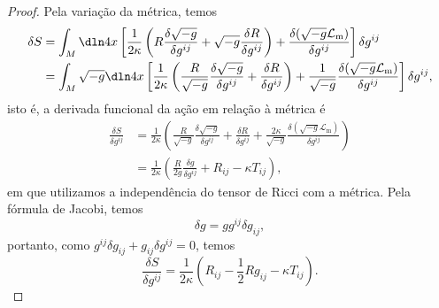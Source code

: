 \documentclass[portuguese]{artigo}
\begin{document}
\begin{proof}
    Pela variação da métrica, temos
    \begin{align*}
        \delta S &= \int_M \dln4x \left[\frac1{2 \kappa}\left(R \frac{\delta\sqrt{-g}}{\delta g^{ij}} + \sqrt{-g} \frac{\delta R}{\delta g^{ij}}\right) + \frac{\delta (\sqrt{-g} \mathcal{L}_\mathrm{m})}{\delta g^{ij}}\right] \delta g^{ij}\\
                 &=\int_M \sqrt{-g}\dln4x \left[\frac1{2 \kappa}\left(\frac{R}{\sqrt{-g}} \frac{\delta\sqrt{-g}}{\delta g^{ij}} +  \frac{\delta R}{\delta g^{ij}}\right) + \frac{1}{\sqrt{-g}}\frac{\delta (\sqrt{-g} \mathcal{L}_\mathrm{m})}{\delta g^{ij}}\right] \delta g^{ij},
    \end{align*}
    isto é, a derivada funcional da ação em relação à métrica é
    \begin{align*}
        \frac{\delta S}{\delta g^{ij}} &= \frac{1}{2 \kappa}\left(\frac{R}{\sqrt{-g}} \frac{\delta \sqrt{-g}}{\delta g^{ij}} + \frac{\delta R}{\delta g^{ij}} + \frac{2 \kappa}{\sqrt{-g}}\frac{\delta(\sqrt{-g}\mathcal{L}_\mathrm{m})}{\delta g^{ij}}\right)\\
                                       &=\frac{1}{2 \kappa}\left(\frac{R}{2g} \frac{\delta g}{\delta g^{ij}} + R_{ij} - \kappa T_{ij}\right),
    \end{align*}
    em que utilizamos a independência do tensor de Ricci com a métrica. Pela fórmula de Jacobi, temos
    \begin{equation*}
        \delta g = g g^{ij} \delta g_{ij},
    \end{equation*}
    portanto, como \(g^{ij} \delta g_{ij} + g_{ij} \delta g^{ij} = 0\), temos
    \begin{equation*}
        \frac{\delta S}{\delta g^{ij}} = \frac{1}{2 \kappa}\left(R_{ij} - \frac{1}{2}R g_{ij} - \kappa T_{ij}\right).
    \end{equation*}


\end{proof}
\end{document}
